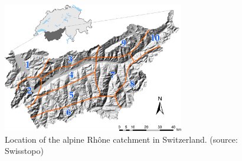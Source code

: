 \documentclass{ametsoc}
\begin{document}
\clearpage



%


\begin{figure}[htb]
	\centerline{\includegraphics[width=7.9cm]{figures/figure_map.pdf}}
	\caption{Location of the alpine Rh\^{o}ne catchment in Switzerland. (source: Swisstopo)}
	\label{fig:map}
\end{figure}
\end{document}
